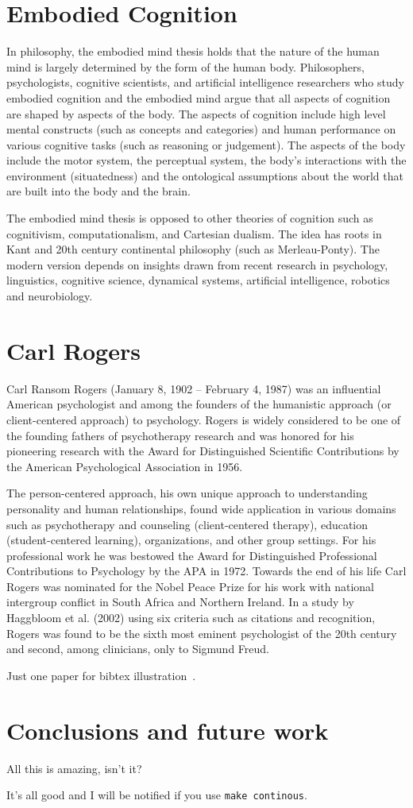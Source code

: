 \section{Embodied Cognition}
\label{sec:embodiement}
In philosophy, the embodied mind thesis holds that the nature of the human mind is largely determined by the form of the human body.
Philosophers, psychologists, cognitive scientists, and artificial intelligence researchers who study embodied cognition and the embodied mind argue that all aspects of cognition are shaped by aspects of the body.
The aspects of cognition include high level mental constructs (such as concepts and categories) and human performance on various cognitive tasks (such as reasoning or judgement).
The aspects of the body include the motor system, the perceptual system, the body's interactions with the environment (situatedness) and the ontological assumptions about the world that are built into the body and the brain.

The embodied mind thesis is opposed to other theories of cognition such as cognitivism, computationalism, and Cartesian dualism.
The idea has roots in Kant and 20th century continental philosophy (such as Merleau-Ponty).
The modern version depends on insights drawn from recent research in psychology, linguistics, cognitive science, dynamical systems, artificial intelligence, robotics and neurobiology.

\section{Carl Rogers}
Carl Ransom Rogers (January 8, 1902 -- February 4, 1987) was an influential American psychologist and among the founders of the humanistic approach (or client-centered approach) to psychology.
Rogers is widely considered to be one of the founding fathers of psychotherapy research and was honored for his pioneering research with the Award for Distinguished Scientific Contributions by the American Psychological Association in 1956.

The person-centered approach, his own unique approach to understanding personality and human relationships, found wide application in various domains such as psychotherapy and counseling (client-centered therapy), education (student-centered learning), organizations, and other group settings.
For his professional work he was bestowed the Award for Distinguished Professional Contributions to Psychology by the APA in 1972.
Towards the end of his life Carl Rogers was nominated for the Nobel Peace Prize for his work with national intergroup conflict in South Africa and Northern Ireland.
In a study by Haggbloom et al. (2002) using six criteria such as citations and recognition, Rogers was found to be the sixth most eminent psychologist of the 20th century and second, among clinicians, only to Sigmund Freud.


Just one paper for bibtex illustration~\cite{rogers1967person}.

\section{Conclusions and future work}
\label{sec:concl}
All this is amazing, isn't it?

It's all good and I will be notified if you use {\tt make continous}.

